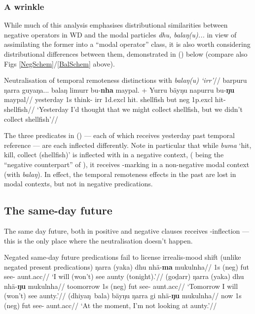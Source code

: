 \subsubsection*{A wrinkle}

While much of this analysis emphasises distributional similarities between negative operators in WD and the modal particles \textit{dhu, balaŋ(u)...} in view of assimilating the former into a ``modal operator'' class, it is also worth considering distributional differences between them, demonstrated in (\nextx) below (compare also Figs \ref{NegSchem}/\ref{BalSchem} above).

\pex\begingl\glpreamble Neutralisation of temporal remoteness distinctions with \textit{balaŋ(u) `\gls{irr}'}//
\gla barpuru ŋarra guyaŋa... balaŋ limurr bu-\textbf{nha} maypal. + Yurru bäyŋu napurru bu-\textbf{ŋu} maypal//
\glb yesterday 1s think-\I{} \gls{irr} 1d.\gls{excl} hit.\IV{} shellfish but \gls{neg} 1p.\gls{excl} hit-\II{} shellfish//
\glft`Yesterday I'd thought that we might collect shellfish, but we didn't collect shellfish'\trailingcitation{[AW~20190429]}//\endgl
\xe{}


The three predicates in (\lastx) --- each of which receives yesterday past temporal reference --- are each inflected differently. Note in particular that while \textit{buma} `hit, kill, collect (shellfish)' is inflected with \II{}  in a negative context, (\II{} being the ``negative counterpart'' of \I{}), it receives \IV{}-marking in a non-negative modal context (with \textit{balaŋ}). In effect, the temporal remoteness effects in the past are lost in modal contexts, but not in negative predications.



\subsection{The same-day future}\label{yolngu-sdf}


The same day future, both in positive and negative clauses receives \I-inflection --- this is the only place where the neutralisation doesn't happen.

\pex Negated same-day future predications fail to license irrealis-mood shift (unlike negated present predications)\trailingcitation{[AW~20190501]}
\a\begingl\gla ŋarra (yaka) dhu nhä-\textbf{ma} mukulnha//
\glb 1s (\gls{neg}) \gls{fut} see-\I{} aunt.\gls{acc}//
\glft `I will (won't) see aunty (tonight).'//\endgl
\a \begingl\gla (goḏarr) ŋarra (yaka) dhu nhä-\textbf{ŋu} mukulnha//
\glb toomorrow 1s (\gls{neg}) \gls{fut} see-\II{} aunt.\gls{acc}//
\glft `Tomorrow I will (won't) see aunty.'//\endgl
\a\begingl\gla (dhiyaŋ~bala) bäyŋu ŋarra gi nhä-\textbf{ŋu} mukulnha//
\glb now 1s (\gls{neg}) \gls{fut} see-\II{} aunt.\gls{acc}//
\glft `At the moment, I'm not looking at aunty.'//\endgl
\xe

